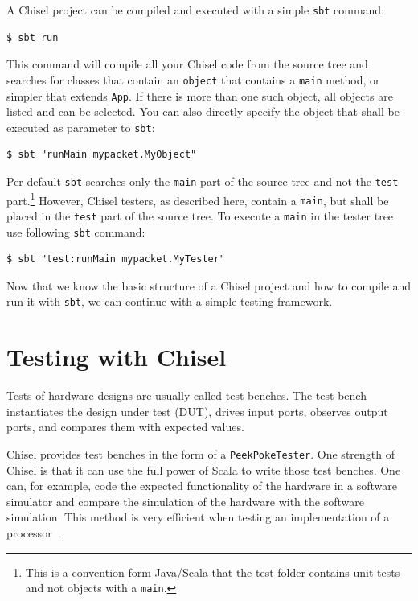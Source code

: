 \documentclass[%
    10pt, %
    headinclude, footexclude,
    openright, %
    notitlepage,
    cleardoubleempty,
    headsepline,
    pointlessnumbers,
    bibtotoc, idxtotoc,
    ]{scrbook}
\newcommand{\code}[1]{{\small{\texttt{#1}}}}
\newcommand{\codefoot}[1]{{\footnotesize{\texttt{#1}}}}
\newcommand{\myref}[2]{\href{#1}{#2}}
\begin{document}
A Chisel project can be compiled and executed with a simple \code{sbt} command:

\begin{verbatim}
$ sbt run
\end{verbatim}

This command will compile all your Chisel code from the source tree and searches
for classes that contain an \code{object} that contains a \code{main} method, or simpler
that extends \code{App}. If there is more than one such object, all objects are listed and
can be selected.
You can also directly specify the object that shall be executed as parameter to \code{sbt}:

\begin{verbatim}
$ sbt "runMain mypacket.MyObject"
\end{verbatim}

Per default \code{sbt} searches only the \code{main} part of the source tree and not
the \code{test} part.\footnote{This is a convention form Java/Scala that the test folder contains
unit tests and not objects with a \codefoot{main}.} However, Chisel testers, as described here,
contain a \code{main}, but shall be placed in the \code{test} part of the source tree.
To execute a \code{main} in the tester tree use following \code{sbt} command:

\begin{verbatim}
$ sbt "test:runMain mypacket.MyTester"
\end{verbatim}

Now that we know the basic structure of a Chisel project and how to compile and run it
with \code{sbt}, we can continue with a simple testing framework.
    
\section{Testing with Chisel}

Tests of hardware designs are usually called \myref{https://www.xilinx.com/support/documentation/sw_manuals/xilinx10/isehelp/ise_c_simulation_test_bench.htm}{test benches}.
The test bench instantiates the design under test (DUT), drives input ports, observes output ports,
and compares them with expected values.

Chisel provides test benches in the form of a \code{PeekPokeTester}.
One strength of Chisel is that it can use the full power of Scala to write those
test benches. One can, for example, code the expected functionality of the hardware
in a software simulator and compare the simulation of the hardware with the
software simulation. This method is very efficient when testing an implementation
of a processor~\cite{lipsi:arcs2018}.
\end{document}
